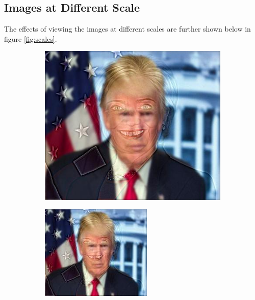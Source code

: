 \documentclass[a4paper,12pt]{article}
\begin{document}
	\subsection{Images at Different Scale}
	The effects of viewing the images at different scales are further shown below in figure \ref{fig:scales}.
	\begin{figure}[h!]
		\centering
		\begin{subfigure}{0.65\textwidth}
			\centering
			\includegraphics[width=0.99\linewidth]{images/trump_hilary}
			\caption{}
			\label{}
		\end{subfigure}
		\begin{subfigure}{0.3\textwidth}
			\centering
			\includegraphics[width=0.99\linewidth]{images/th_half}

\end{subfigure}
\end{figure}
\end{document}
